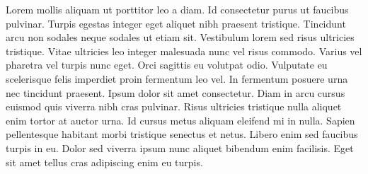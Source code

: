 Lorem mollis aliquam ut porttitor leo a diam. Id consectetur purus ut faucibus pulvinar. Turpis egestas integer eget aliquet nibh praesent tristique. Tincidunt arcu non sodales neque sodales ut etiam sit. Vestibulum lorem sed risus ultricies tristique. Vitae ultricies leo integer malesuada nunc vel risus commodo. Varius vel pharetra vel turpis nunc eget. Orci sagittis eu volutpat odio. Vulputate eu scelerisque felis imperdiet proin fermentum leo vel. In fermentum posuere urna nec tincidunt praesent. Ipsum dolor sit amet consectetur. Diam in arcu cursus euismod quis viverra nibh cras pulvinar. Risus ultricies tristique nulla aliquet enim tortor at auctor urna. Id cursus metus aliquam eleifend mi in nulla. Sapien pellentesque habitant morbi tristique senectus et netus. Libero enim sed faucibus turpis in eu. Dolor sed viverra ipsum nunc aliquet bibendum enim facilisis. Eget sit amet tellus cras adipiscing enim eu turpis.
